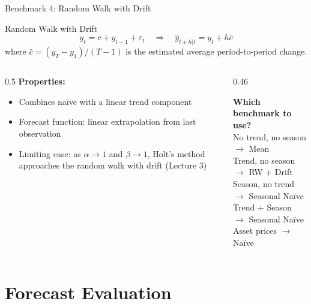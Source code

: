 \documentclass[aspectratio=169, 11pt]{beamer}
\begin{document}
\begin{frame}{Benchmark 4: Random Walk with Drift}
  \begin{definitionbox}{Random Walk with Drift}
    \[
      y_t = c + y_{t-1} + \varepsilon_t
      \quad \Longrightarrow \quad
      \hat{y}_{t+h|t} = y_t + h\hat{c}
    \]
    where $\hat{c} = (y_T - y_1)/(T-1)$ is the estimated average period-to-period change.
  \end{definitionbox}
  \vspace{0.3cm}
  \begin{columns}[T]
    \begin{column}{0.5\textwidth}
      \textbf{Properties:}
      \begin{itemize}
        \item Combines na\"{i}ve with a linear trend component
        \item Forecast function: linear extrapolation from last observation
        \item Limiting case: as $\alpha \to 1$ and $\beta \to 1$,
              Holt's method approaches the random walk with drift (Lecture 3)
      \end{itemize}
    \end{column}
    \begin{column}{0.46\textwidth}
      \begin{keybox}
        \textbf{Which benchmark to use?}\\[0.2cm]
        \small
        No trend, no season $\rightarrow$ Mean\\
        Trend, no season $\rightarrow$ RW + Drift\\
        Season, no trend $\rightarrow$ Seasonal Na\"{i}ve\\
        Trend + Season $\rightarrow$ Seasonal Na\"{i}ve\\
        Asset prices $\rightarrow$ Na\"{i}ve
      \end{keybox}
    \end{column}
  \end{columns}
\end{frame}

\section{Forecast Evaluation}
\end{document}

